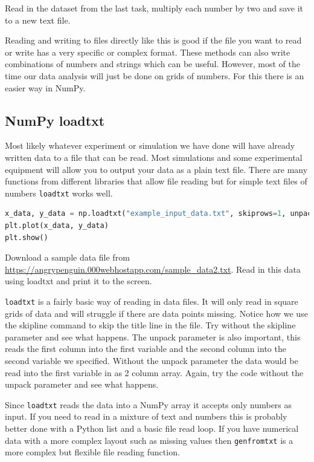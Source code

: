 \begin{task}Read in the dataset from the last task, multiply each number by two and save it to a new text file.\end{task}

Reading and writing to files directly like this is good if the file you want to read or write has a very specific or complex format. These methods can also write combinations of numbers and strings which can be useful. However, most of the time our data analysis will just be done on grids of numbers. For this there is an easier way in NumPy.

	\subsection{NumPy loadtxt}
		Most likely whatever experiment or simulation we have done will have already written data to a file that can be read. Most simulations and some experimental equipment will allow you to output your data as a plain text file. There are many functions from different libraries that allow file reading but for simple text files of numbers \texttt{loadtxt} works well.
		\begin{lstlisting}[language=Python]
x_data, y_data = np.loadtxt("example_input_data.txt", skiprows=1, unpack=True)
plt.plot(x_data, y_data)
plt.show()\end{lstlisting}
\begin{task}Download a sample data file from \url{https://angrypenguin.000webhostapp.com/sample_data2.txt}. Read in this data using loadtxt and print it to the screen.\end{task}

\texttt{loadtxt} is a fairly basic way of reading in data files. It will only read in square grids of data and will struggle if there are data points missing. Notice how we use the skipline command to skip the title line in the file. Try without the skipline parameter and see what happens. The unpack parameter is also important, this reads the first column into the first variable and the second column into the second variable we specified. Without the unpack parameter the data would be read into the first variable in as 2 column array. Again, try the code without the unpack parameter and see what happens.

Since \texttt{loadtxt} reads the data into a NumPy array it accepts only numbers as input. If you need to read in a mixture of text and numbers this is probably better done with a Python list and a basic file read loop. If you have numerical data with a more complex layout such as missing values then \texttt{genfromtxt} is a more complex but flexible file reading function.

